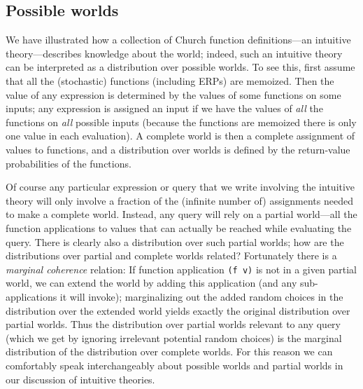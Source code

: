 \documentclass[pdfextras]{handbook}
\begin{document}
 
 
 \subsection{Possible worlds}



We have illustrated how a collection of Church function definitions---an intuitive theory---describes knowledge about the world; indeed, such an intuitive theory can be interpreted as a distribution over possible worlds. To see this, first assume that all the (stochastic) functions (including ERPs) are memoized. Then the value of any expression is determined by the values of some functions on some inputs; any expression is assigned an input if we have the values of \emph{all} the functions on \emph{all} possible inputs (because the functions are memoized there is only one value in each evaluation). A complete world is then a complete assignment of values to functions, and a distribution over worlds is defined by the return-value probabilities of the functions.

Of course any particular expression or query that we write involving the intuitive theory will only involve a fraction of the (infinite number of) assignments needed to make a complete world. Instead, any query will rely on a partial world---all the function applications to values that can actually be reached while evaluating the query. There is clearly also a distribution over such partial worlds; how are the distributions over partial and complete worlds related? Fortunately there is a \emph{marginal coherence} relation: If function application \lstinline{(f v)} is not in a given partial world, we can extend the world by adding this application (and any sub-applications it will invoke); marginalizing out the added random choices in the distribution over the extended world yields exactly the original distribution over partial worlds.
Thus the distribution over partial worlds relevant to any query (which we get by ignoring irrelevant potential random choices) is the marginal distribution of the distribution over complete worlds.
For this reason we can comfortably speak interchangeably about possible worlds and partial worlds in our discussion of intuitive theories.
\end{document}
